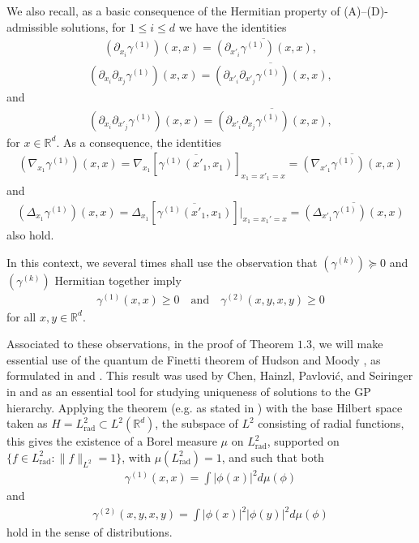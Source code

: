 \documentclass[reqno]{amsart}
\numberwithin{equation}{section}
\theoremstyle{remark}
\DeclareMathOperator{\rad}{rad}
\begin{document}
We also recall, as a basic consequence of the Hermitian property of (A)--(D)-admissible solutions, for $1\leq i\leq d$ we have the identities 
\begin{align}
(\partial_{x_i}\gamma^{(1)})(x,x)=\overline{(\partial_{x'_i}\gamma^{(1)})(x,x)},\label{label_35}
\end{align}
\begin{align}
(\partial_{x_i}\partial_{x_j}\gamma^{(1)})(x,x)=\overline{(\partial_{x'_i}\partial_{x'_j}\gamma^{(1)})(x,x)},\label{label_36}
\end{align}
and
\begin{align}
(\partial_{x_i}\partial_{x'_j}\gamma^{(1)})(x,x)=\overline{(\partial_{x'_i}\partial_{x_j}\gamma^{(1)})(x,x)},\label{label_37}
\end{align}
for $x\in\mathbb{R}^d$.  As a consequence, the identities 
\begin{align}
(\nabla_{x_1}\gamma^{(1)})(x,x)=\nabla_{x_1}[\overline{\gamma^{(1)}(x'_1,x_1)}]_{x_1=x'_1=x}=\overline{(\nabla_{x'_1}\gamma^{(1)})(x,x)}
\end{align}
and
\begin{align}
(\Delta_{x_1}\gamma^{(1)})(x,x)=\Delta_{x_1}[\overline{\gamma^{(1)}(x'_1,x_1)}]|_{x_1=x_1'=x}=\overline{(\Delta_{x'_1}\gamma^{(1)})(x,x)}\label{label_a1}
\end{align}
also hold.

In this context, we several times shall use the observation that $(\gamma^{(k)})\succeq 0$ and $(\gamma^{(k)})$ Hermitian together imply
\begin{align}
\gamma^{(1)}(x,x)\geq 0\quad\textrm{and}\quad \gamma^{(2)}(x,y,x,y)\geq 0\label{label_50}
\end{align}
for all $x,y\in\mathbb{R}^d$.

Associated to these observations, in the proof of Theorem $1.3$, we will make essential use of the quantum de Finetti theorem of Hudson and Moody \cite{HM}, as formulated in \cite{LNR} and \cite{CHPS}.  This result was used by Chen, Hainzl, Pavlovi\'c, and Seiringer in \cite{CHPS} and \cite{CHPS2} as an essential tool for studying uniqueness of solutions to the GP hierarchy.  Applying the theorem (e.g. as stated in \cite[Theorem $2.1$]{CHPS}) with the base Hilbert space taken as $H=L^2_{\rad}\subset L^2(\mathbb{R}^{d})$, the subspace of $L^2$ consisting of radial functions, this gives the existence of a Borel measure $\mu$ on $L_{\rad}^2$, supported on $\{f\in L_{\rad}^2:\lVert f\rVert_{L^2}=1\}$, with $\mu(L_{\rad}^2)=1$, and such that both
\begin{align}
\gamma^{(1)}(x,x)=\int |\phi(x)|^2d\mu(\phi)\label{label_48}
\end{align}
and
\begin{align}
\gamma^{(2)}(x,y,x,y)=\int |\phi(x)|^2|\phi(y)|^2d\mu(\phi)\label{label_49}
\end{align}
hold in the sense of distributions.
\end{document}
